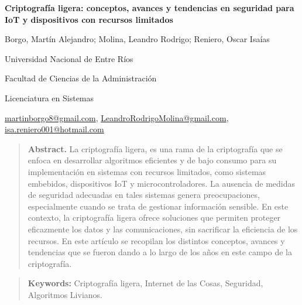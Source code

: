 \documentclass[a4paper,10pt]{article}
\begin{document}
	\centering
	{\fontsize{14}{17}\bfseries Criptografía ligera: conceptos, avances y tendencias en seguridad para IoT y dispositivos con recursos limitados\par}
	{\small Borgo, Martín Alejandro; Molina, Leandro Rodrigo; Reniero, Oscar Isaías\par}
	{\normalsize Universidad Nacional de Entre Ríos\par}
	{\normalsize Facultad de Ciencias de la Administración\par}
	{\normalsize Licenciatura en Sistemas\par}
	{\small \href{mailto:martinborgo8@gmail.com}{martinborgo8@gmail.com}, \href{mailto:LeandroRodrigoMolina@gmail.com}{LeandroRodrigoMolina@gmail.com}, \href{mailto:isa.reniero001@hotmail.com}{isa.reniero001@hotmail.com}\par}	
	{\begin{quote} \small \justify \textbf{Abstract.} La criptografía ligera, es una rama de la criptografía que se enfoca en desarrollar algoritmos eficientes y de bajo consumo para su implementación en sistemas con recursos limitados, como sistemas embebidos, dispositivos IoT y microcontroladores. La ausencia de medidas de seguridad adecuadas en tales sistemas genera preocupaciones, especialmente cuando se trata de gestionar información sensible. En este contexto, la criptografía ligera ofrece soluciones que permiten proteger eficazmente los datos y las comunicaciones, sin sacrificar la eficiencia de los recursos. En este artículo se recopilan los distintos conceptos, avances y tendencias que se fueron dando a lo largo de los años en este campo de la criptografía.\end{quote} \par}
	{\begin{quote} \small \justify  \textbf{Keywords:} Criptografía ligera, Internet de las Cosas, Seguridad, Algoritmos Livianos. \end{quote} \par}
	
	\justifying
\end{document}
